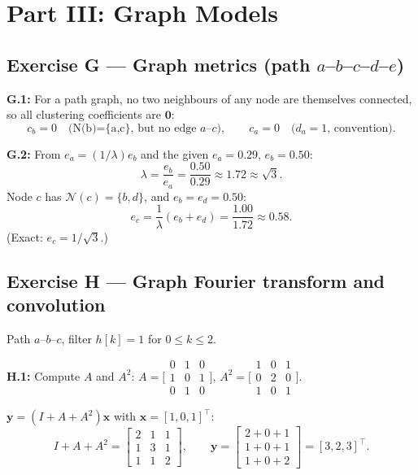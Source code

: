 \documentclass[12pt,a4paper]{article}
\begin{document}
\newpage
\section*{Part III: Graph Models}

\subsection*{Exercise G --- Graph metrics (path $a$--$b$--$c$--$d$--$e$)}

\textbf{G.1:} For a path graph, no two neighbours of any node are themselves connected, so all clustering coefficients are $\mathbf{0}$:
\[
  c_b = 0 \quad \text{(N(b)=\{a,c\}, but no edge $a$--$c$)},\qquad
  c_a = 0 \quad \text{($d_a=1$, convention)}.
\]

\textbf{G.2:} From $e_a=(1/\lambda)e_b$ and the given $e_a=0.29$, $e_b=0.50$:
\[
  \lambda = \frac{e_b}{e_a}=\frac{0.50}{0.29}\approx 1.72\approx\sqrt{3}.
\]
Node $c$ has $\mathcal{N}(c)=\{b,d\}$, and $e_b=e_d=0.50$:
\[
  e_c=\frac{1}{\lambda}(e_b+e_d)=\frac{1.00}{1.72}\approx\boxed{0.58.}
\]
(Exact: $e_c=1/\sqrt{3}$.)

\subsection*{Exercise H --- Graph Fourier transform and convolution}

Path $a$--$b$--$c$, filter $h[k]=1$ for $0\le k\le 2$.

\textbf{H.1:} Compute $A$ and $A^2$:
$A=\bigl[\begin{smallmatrix}0&1&0\\1&0&1\\0&1&0\end{smallmatrix}\bigr]$,\;
$A^2=\bigl[\begin{smallmatrix}1&0&1\\0&2&0\\1&0&1\end{smallmatrix}\bigr]$.

$\mathbf{y}=(I+A+A^2)\mathbf{x}$ with $\mathbf{x}=[1,0,1]^\top$:
\[
  I+A+A^2=\begin{bmatrix}2&1&1\\1&3&1\\1&1&2\end{bmatrix},\qquad
  \mathbf{y}=\begin{bmatrix}2+0+1\\1+0+1\\1+0+2\end{bmatrix}=\boxed{[3,2,3]^\top.}
\]
\end{document}
